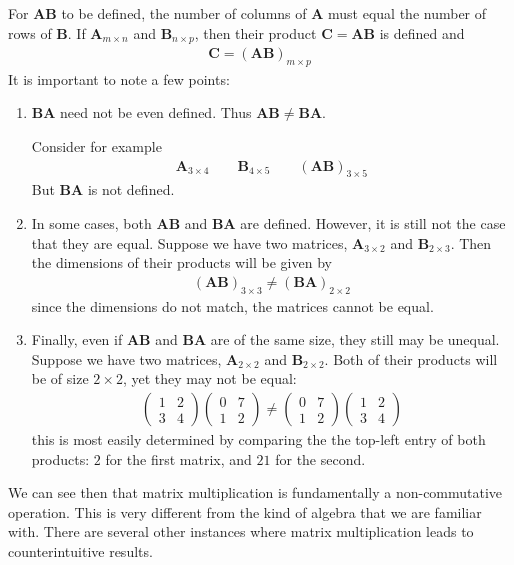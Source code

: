 \documentclass[11pt]{article}
\newcommand{\mat}[1]{\mathbf{#1}}
\begin{document}
For $\mat{A} \mat{B}$ to be defined, the number of columns of $\mat{A}$ must equal the number of rows of $\mat{B}$. If $\mat{A}_{m \times n}$ and $\mat{B}_{n \times p}$, then their product $\mat{C} = \mat{A}\mat{B}$ is defined and
\begin{align*}
\mat{C} = (\mat{A}\mat{B})_{m \times p}
\end{align*}
It is important to note a few points:
\begin{enumerate}
\item{
$\mat{B}\mat{A}$ need not be even defined. Thus $\mat{A} \mat{B} \neq \mat{B} \mat{A}$.

Consider for example
\begin{align*}
\mat{A}_{3 \times 4}
\qquad
\mat{B}_{4 \times 5}
\qquad
(\mat{A} \mat{B})_{3 \times 5}
\end{align*}
But $\mat{B} \mat{A}$ is not defined.
}
\item{
In some cases, both $\mat{A}\mat{B}$ and $\mat{B}\mat{A}$ are defined. However, it is still not the case that they are equal. Suppose we have two matrices, $\mat{A}_{3 \times 2}$ and $\mat{B}_{2 \times 3}$. Then the dimensions of their products will be given by
\begin{align*}
(\mat{A} \mat{B})_{3 \times 3} \neq (\mat{B} \mat{A})_{2 \times 2}
\end{align*}
since the dimensions do not match, the matrices cannot be equal.
}
\item{
Finally, even if $\mat{A}\mat{B}$ and $\mat{B}\mat{A}$ are of the same size, they still may be unequal. Suppose we have two matrices, $\mat{A}_{2 \times 2}$ and $\mat{B}_{2 \times 2}$. Both of their products will be of size $2 \times 2$, yet they may not be equal:
\begin{align*}
\begin{pmatrix}1 & 2 \\ 3 & 4\end{pmatrix}
\begin{pmatrix}0 & 7 \\ 1 & 2\end{pmatrix}
\neq
\begin{pmatrix}0 & 7 \\ 1 & 2\end{pmatrix}
\begin{pmatrix}1 & 2 \\ 3 & 4\end{pmatrix}
\end{align*}
this is most easily determined by comparing the the top-left entry of both products: $2$ for the first matrix, and $21$ for the second.
}
\end{enumerate}
We can see then that matrix multiplication is fundamentally a non-commutative operation. This is very different from the kind of algebra that we are familiar with. There are several other instances where matrix multiplication leads to counterintuitive results.
\end{document}
